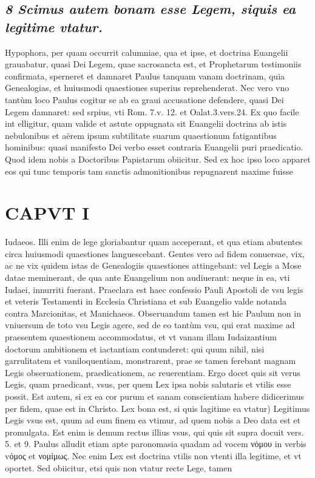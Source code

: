 \documentclass{article}
\begin{document}
\begin{pages}
\subsection*{\textit{8 Scimus autem bonam esse Legem, siquis ea legitime vtatur. }}\pstart Hypophora, per quam occurrit calumniae, qua et ipse, et doctrina Euangelii grauabatur, quasi Dei Legem, quae sacrosancta est, et Prophetarum testimoniis confirmata, sperneret et damnaret Paulus tanquam vanam doctrinam, quia Genealogias, et huiusmodi quaestiones superius reprehenderat. Nec vero vno tantùm loco Paulus cogitur se ab ea graui accusatione defendere, quasi Dei Legem damnaret: sed srpius, vti Rom. 7.v. 12. et Oalat.3.vers.24. Ex quo facile int elligitur, quam valide et astute oppugnata sit Euangelii doctrina ab istis nebulonibus et aërem ipsum subtilitate suarum quaestionum fatigantibus hominibus: quasi manifesto Dei verbo esset contraria Euangelii puri praedicatio. Quod idem nobis a Doctoribus Papistarum obiicitur. Sed ex hoc ipso loco apparet eos qui tunc temporis tam sanctis admonitionibus repugnarent maxime fuisse  \pend
\section*{CAPVT I }
\marginpar{[ p.19 ]}\pstart Iudaeos. Illi enim de lege gloriabantur quam acceperant, et qua etiam abutentes circa huiusmodi quaestiones languescebant. Gentes vero ad fidem conuersae, vix, ac ne vix quidem istas de Genealogiis quaestiones attingebant: vel Legis a Mose datae meminerant, de qua ante Euangelium non audiuerant: neque in ea, vti Iudaei, innurriti fuerant. Praeclara est haec confessio Pauli Apostoli de vsu legis et veteris Testamenti in Ecclesia Christiana et sub Euangelio valde notanda contra Marcionitas, et Manichaeos. Obseruandum tamen est hic Paulum non in vniuersum de toto vsu Legis agere, sed de eo tantùm vsu, qui erat maxime ad praesentem quaestionem accommodatus, et vt vanam illam Iudaizantium doctorum ambitionem et iactantiam contunderet: qui quum nihil, nisi garrulitatem et vaniloquentiam, monstrarent, prae se tamen ferebant magnam Legis obseruationem, praedicationem, ac reuerentiam. Ergo docet quis sit verus Legis, quam praedicant, vsus, per quem Lex ipsa nobis salutaris et vtilis esse possit. Est autem, si ex ea cor purum et sanam conscientiam habere didicerimus per fidem, quae est in Christo.  \pend\pstart Lex bona est, si quis lagitime ea vtatur) Legitimus Legis vsus est, quum ad eum finem ea vtimur, ad quem nobis a Deo data est et promulgata. Est enim is demum rectus illius vsus, qui quis sit supra docuit vers. 5. et 9. Paulus alludit etiam apte paronomasia quadam ad vocem νόμου in verbis vόμος et νομίμως. Nec enim Lex est doctrina vtilis non vtenti illa legitime, et vt oportet. Sed obiicitur, etsi quis non vtatur recte Lege, tamen  \pend

\end{pages}
\end{document}
